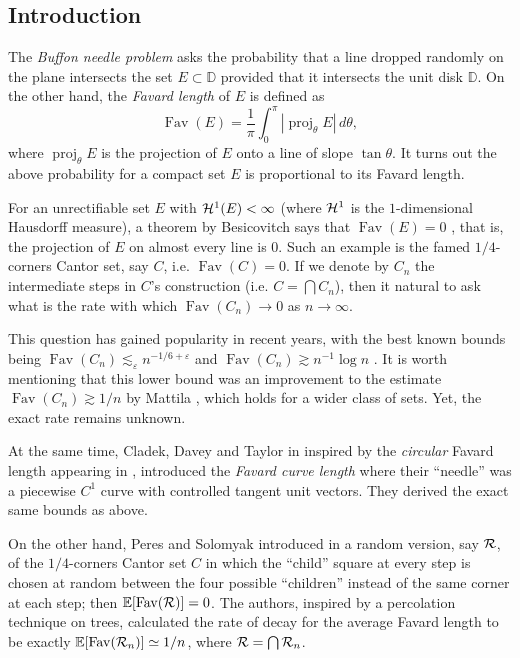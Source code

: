 \documentclass[11pt]{amsart} %
\theoremstyle{remark} %
\theoremstyle{definition} %
\numberwithin{equation}{section} %
\def \D{{\mathbb{D}}}	\def \J{{\mathbb{J}}}	\def \P{{\mathbb{P}}}	\def \V{{\mathbb{V}}}
\def \E{{\mathbb{E}}}	\def \K{{\mathbb{K}}}	\def \Q{{\mathbb{Q}}}	\def \W{{\mathbb{W}}}
\newcommand{\0}[1]{\overline{#1}} %
\newcommand{\1}[1]{\tilde{#1}} %
\newcommand{\2}[1]{{}_{|#1}} %
\DeclareMathOperator{\proj}{proj} %
\DeclareMathOperator{\Fav}{Fav} %
\begin{document}
\subsection*{Introduction}
The \emph{Buffon needle problem} asks the probability that a line dropped randomly on the plane intersects the set $E\subset\D$ provided that it intersects the unit disk $\D$. On the other hand, the \emph{Favard length} of $E$ is defined as
\[\Fav(E)=\frac{1}{π}\int_0^π|\proj_θE|\,dθ,\]
where $\proj_θE$ is the projection of $E$ onto a line of slope $\tan θ$. It turns out the above probability for a compact set $E$ is proportional to its Favard length.

For an unrectifiable set $E$ with ${\mathcal{H}}^1(E)<\infty$ (where ${\mathcal{H}}^1$ is the $1$-dimensional Hausdorff measure), a theorem by Besicovitch says that $\Fav(E)=0$ \cite{Mat1975}, that is, the projection of $E$ on almost every line is $0$. Such an example is the famed $1/4$-corners Cantor set, say $C$, i.e. $\Fav(C)=0$. If we denote by $C_n$ the intermediate steps in $C$'s construction (i.e. $C=\bigcap C_n$), then it natural to ask what is the rate with which $\Fav(C_n)\to 0$ as $n\to\infty$.

This question has gained popularity in recent years, with the best known bounds being $\Fav(C_n)\lesssim_{ε} n^{-1/6+ε}$ \cite{NazPerVol2011} and $\Fav(C_n)\gtrsim n^{-1}\log n$ \cite{BatVol2010}. It is worth mentioning that this lower bound was an improvement to the estimate $\Fav(C_n)\gtrsim 1/n$ by Mattila \cite{Mat1990}, which holds for a wider class of sets. Yet, the exact rate remains unknown.

\medskip

At the same time, Cladek, Davey and Taylor in \cite{ClaDavTay2022} inspired by the \emph{circular} Favard length appearing in \cite{BonVol2010_circular_favard}, introduced the \emph{Favard curve length} where their ``needle'' was a piecewise $C^1$ curve with controlled tangent unit vectors. They derived the exact same bounds as above.

\smallskip

On the other hand, Peres and Solomyak introduced in \cite{PerSol2002} a random version, say ${\mathcal{R}}$, of the $1/4$-corners Cantor set $C$ in which the ``child'' square at every step is chosen at random between the four possible ``children'' instead of the same corner at each step; then $\E[\Fav(\cR)]=0$. The authors, inspired by a percolation technique on trees, calculated the rate of decay for the average Favard length to be exactly $\E[\Fav(\cR_n)]\simeq 1/n$, where ${\mathcal{R}}=\bigcap{\mathcal{R}}_n$.
\end{document}
